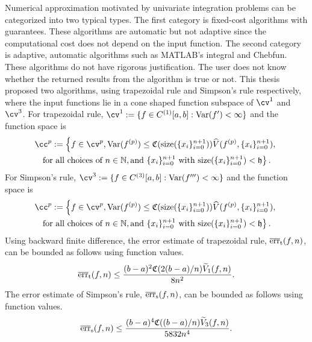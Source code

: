 \documentclass{iitthesis}
\DeclareMathOperator{\Var}{Var}
\theoremstyle{definition}
\theoremstyle{remark}
\begin{document}
Numerical approximation motivated by univariate integration problems can be categorized into two typical types. The first category is fixed-cost algorithms with guarantees. These algorithms are automatic but not adaptive since the computational cost does not depend on the input function. The second category is adaptive, automatic algorithms such as MATLAB's integral and Chebfun. These algorithms do not have rigorous justification. The user does not know whether the returned results from the algorithm is true or not. This thesis proposed two algorithms, using trapezoidal rule and Simpson's rule respectively, where the input functions lie in a cone shaped function subspace of $\cv^1$ and $\cv^3$. For trapezoidal rule, $\cv^{1}:=\{f\in C^{(1)}[a,b]: \Var(f') < \infty \}$ and the function space is 
\begin{multline*}
\cc^{p}:=\left\{f\in \cv^{p}, \Var(f^{(p)})\leq \mathfrak{C}(\text{size}(\{x_i\}_{i=0}^{n+1}))\widehat{V}(f^{(p)},\{x_i\}_{i=0}^{n+1}),\right.\\ \left.\text{for all choices of } n\in \mathbb{N}, \text{and }\{x_i\}_{i=0}^{n+1} \text{ with }\text{size}(\{x_i\}_{i=0}^{n+1})<\mathfrak{h}\right\}.
\end{multline*}
 For Simpson's rule, $\cv^{3}:=\{f\in C^{(3)}[a,b]: \Var(f''') < \infty \}$ and the function space is 
 \begin{multline*}
\cc^{p}:=\left\{f\in \cv^{p}, \Var(f^{(p)})\leq \mathfrak{C}(\text{size}(\{x_i\}_{i=0}^{n+1}))\widehat{V}(f^{(p)},\{x_i\}_{i=0}^{n+1}),\right.\\ \left.\text{for all choices of } n\in \mathbb{N}, \text{and }\{x_i\}_{i=0}^{n+1} \text{ with }\text{size}(\{x_i\}_{i=0}^{n+1})<\mathfrak{h}\right\}.
\end{multline*}
  Using backward finite difference, the error estimate of trapezoidal rule, $\overline{\textup{err}}_{\textup{t}}(f,n)$, can be bounded as follows using function values.
 \begin{equation*}
   \overline{\textup{err}}_{\textup{t}}(f,n)\leq \frac{(b-a)^2\mathfrak{C}(2(b-a)/n)\widetilde{V}_1(f,n)}{8n^2}.
 \end{equation*}
The error estimate of Simpson's rule, $\overline{\textup{err}}_{\textup{s}}(f,n)$, can be bounded as follows using function values.
\begin{equation*}
  \overline{\textup{err}}_{\text{s}}(f,n)\leq \frac{(b-a)^4\mathfrak{C}((b-a)/n)\widetilde{V}_3(f,n)}{5832n^4}.
\end{equation*}
\end{document}
